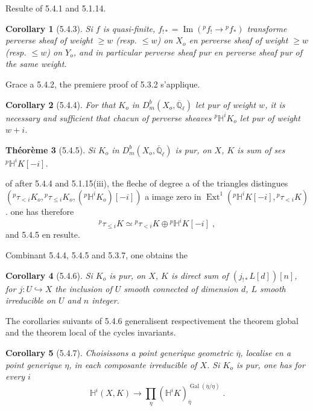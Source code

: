 \documentclass[12pt,a4paper]{article}
\theoremstyle{plain}
\newtheorem{theorem}{Th\'eor\`eme}[section]
\newtheorem{corollary}[theorem]{Corollary}
\theoremstyle{definition}
\theoremstyle{remark}
\DeclareMathOperator{\Ext}{Ext}
\DeclareMathOperator{\Imn}{Im}
\DeclareMathOperator{\Gal}{Gal}
\newcommand{\HH}{\mathbb{H}}
\newcommand{\QQ}{\mathbb{Q}}
\begin{document}
Resulte of 5.4.1 and 5.1.14.

\begin{corollary}[5.4.3]
Si $f$ is quasi-finite, $f_{!*} = \Imn({}^{p}f_! \to {}^{p}f_*)$ transforme perverse sheaf of weight $\geq w$ (resp. $\leq w$) on $X_o$ en perverse sheaf of weight $\geq w$ (resp. $\leq w$) on $Y_o$, and in particular perverse sheaf pur en perverse sheaf pur of the same weight.
\end{corollary}

Grace a 5.4.2, the premiere proof of 5.3.2 s'applique.

\begin{corollary}[5.4.4]
For that $K_o$ in $D^b_m(X_o, \overline{\QQ}_{\ell})$ let pur of weight $w$, it is necessary and sufficient that chacun of perverse sheaves ${}^{p}\HH^iK_o$ let pur of weight $w+i$.
\end{corollary}

\begin{theorem}[5.4.5]
Si $K_o$ in $D^b_m(X_o, \overline{\QQ}_{\ell})$ is pur, on $X$, $K$ is sum of ses ${}^{p}\HH^iK[-i]$.
\end{theorem}

of after 5.4.4 and 5.1.15(iii), the fleche of degree a of the triangles distingues $({}^{p}\tau_{<i}K_o, {}^{p}\tau_{\leq i}K_o, ({}^{p}\HH^iK_o)[-i])$ a image zero in $\Ext^1({}^{p}\HH^iK[-i], {}^{p}\tau_{<i}K)$. one has therefore
\[
{}^{p}\tau_{\leq i}K \simeq {}^{p}\tau_{<i}K \oplus {}^{p}\HH^iK[-i]\;,
\]
and 5.4.5 en resulte.

Combinant 5.4.4, 5.4.5 and 5.3.7, one obtains the

\begin{corollary}[5.4.6]
Si $K_o$ is pur, on $X$, $K$ is direct sum of $(j_{!*}L[d])[n]$, for $j: U \hookrightarrow X$ the inclusion of $U$ smooth connected of dimension $d$, $L$ smooth irreducible on $U$ and $n$ integer.
\end{corollary}

The corollaries suivants of 5.4.6 generalisent respectivement the theorem global and the theorem local of the cycles invariants.

\begin{corollary}[5.4.7]
Choisissons a point generique geometric $\overline{\eta}$, localise en a point generique $\eta$, in each composante irreducible of $X$. Si $K_o$ is pur, one has for every $i$
\begin{equation}\label{eq:5.4.7.1}
\HH^i(X, K) \longrightarrow \prod_{\eta} (\HH^iK)_{\overline{\eta}}^{\Gal(\overline{\eta}/\eta)}\;.
\end{equation}
\end{corollary}
\end{document}
